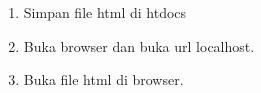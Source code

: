 \documentclass[a4paper,12pt]{article}
\begin{document}
\begin{enumerate}
    \item 
        \begin{minipage}[t]{\linewidth}
              \raggedright

              \medskip
              Simpan file html di htdocs
        \end{minipage}

    \item 
        \begin{minipage}[t]{\linewidth}
              \raggedright

              \medskip
              Buka browser dan buka url localhost.
        \end{minipage}

    \item 
        \begin{minipage}[t]{\linewidth}
              \raggedright

              \medskip
              Buka file html di browser.
        \end{minipage}
\end{enumerate}
\end{document}
